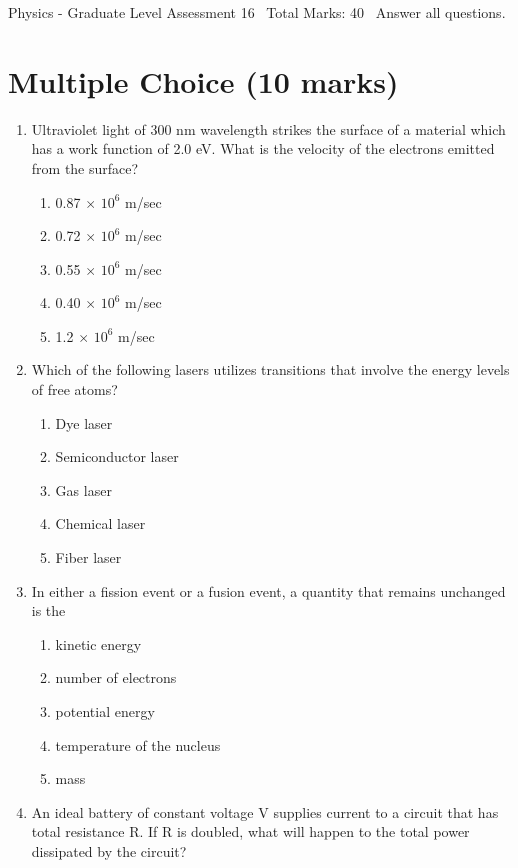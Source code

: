 \documentclass[12pt]{article}
\begin{document}
\begin{center}
Physics - Graduate Level Assessment 16 \
Total Marks: 40 \
Answer all questions.
\end{center}

\section*{Multiple Choice (10 marks)}
\begin{enumerate}[label=\arabic*.]
\item Ultraviolet light of 300 nm wavelength strikes the surface of a material which has a work function of 2.0 eV. What is the velocity of the electrons emitted from the surface?
\begin{enumerate}[label=(\alph*)]
    \item 0.87 \ensuremath{\times} $10^6$ m/sec
    \item 0.72 \ensuremath{\times} $10^6$ m/sec
    \item 0.55 \ensuremath{\times} $10^6$ m/sec
    \item 0.40 \ensuremath{\times} $10^6$ m/sec
    \item 1.2 \ensuremath{\times} $10^6$ m/sec
\end{enumerate}
\item Which of the following lasers utilizes transitions that involve the energy levels of free atoms?
\begin{enumerate}[label=(\alph*)]
    \item Dye laser
    \item Semiconductor laser
    \item Gas laser
    \item Chemical laser
    \item Fiber laser
\end{enumerate}
\item In either a fission event or a fusion event, a quantity that remains unchanged is the
\begin{enumerate}[label=(\alph*)]
    \item kinetic energy
    \item number of electrons
    \item potential energy
    \item temperature of the nucleus
    \item mass
\end{enumerate}
\item An ideal battery of constant voltage V supplies current to a circuit that has total resistance R. If R is doubled, what will happen to the total power dissipated by the circuit?

\end{enumerate}
\end{document}
